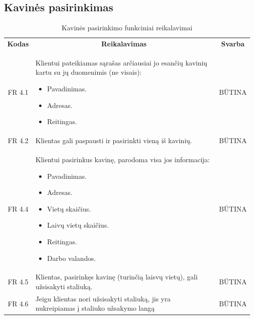 \documentclass{VUMIFPSkursinis}
\begin{document}
\subsection{Kavinės pasirinkimas}

\begin{center}
	\begin{table}[H]
	\caption{Kavinės pasirinkimo funkciniai reikalavimai}
	\begin{tabular}{|p{2cm}|p{}|p{}|}
	
	\hline
	    \rowcolor{lightgray}
		\multicolumn{3}{|c|}{Kavinės pasirinkimas}\\
		
	\hline
		\multicolumn{1}{|c|}{{\bfseries Kodas}}&
		\multicolumn{1}{|c|}{{\bfseries Reikalavimas}}&
		\multicolumn{1}{|c|}{{\bfseries Svarba}}\\

	\hline
	
		\multicolumn{1}{|c|}{FR 4.1}&
		{Klientui pateikiamas sąrašas arčiausiai jo esančių kavinių kartu su jų duomenimis (ne visais):
		\begin{itemize}
			\item Pavadinimas.
			\item Adresas.
			\item Reitingas.
		\end{itemize}}&
		\multicolumn{1}{|c|}{BŪTINA}\\	
		
	\hline
	
		\multicolumn{1}{|c|}{FR 4.2}&
		{Klientas gali paspausti ir pasirinkti vieną iš kavinių.}&
		\multicolumn{1}{|c|}{BŪTINA}\\
		
	\hline
	
		\multicolumn{1}{|c|}{FR 4.4}&
		{Klientui pasirinkus kavinę, parodoma visa jos informacija:
		\begin{itemize}
			\item Pavadinimas.
			\item Adresas.
			\item Vietų skaičius.
			\item Laivų vietų skaičius.
			\item Reitingas.
			\item Darbo valandos.
		\end{itemize}}&
		\multicolumn{1}{|c|}{BŪTINA}\\
		
	\hline
	
		\multicolumn{1}{|c|}{FR 4.5}&
		{Klientas, pasirinkęs kavinę (turinčią laisvų vietų), gali užsisakyti staliuką.}&
		\multicolumn{1}{|c|}{BŪTINA}\\
	\hline
	
		\multicolumn{1}{|c|}{FR 4.6}&
		{Jeigu klientas nori užsisakyti staliuką, jis yra nukreipiamas į staliuko užsakymo langą}&
		\multicolumn{1}{|c|}{BŪTINA}\\				
	\hline
	
	\end{tabular}		
	
	\label{table:KavinėsPasirinkimas}
	\end{table}


\end{center}
\end{document}
